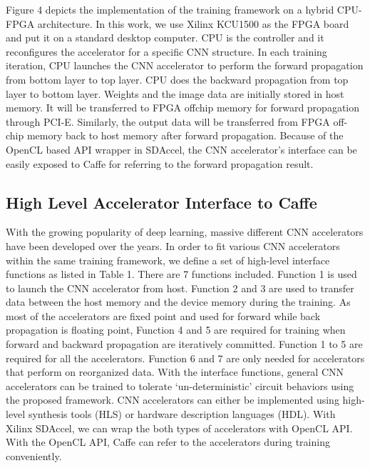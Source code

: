 Figure 4 depicts the implementation of the training framework on a hybrid 
CPU-FPGA architecture. In this work, we use Xilinx KCU1500 as the FPGA board 
and put it on a standard desktop computer. CPU is the controller and it reconfigures 
the accelerator for a specific CNN structure. In each training iteration, CPU launches 
the CNN accelerator to perform the forward propagation from bottom layer to top layer. 
CPU does the backward propagation from top layer to bottom layer. Weights and the image 
data are initially stored in host memory. It will be transferred to FPGA offchip memory 
for forward propagation through PCI-E. Similarly, the output data will be transferred 
from FPGA off-chip memory back to host memory after forward propagation. Because of the 
OpenCL based API wrapper in SDAccel, the CNN accelerator’s interface can be easily 
exposed to Caffe for referring to the forward propagation result. 



\subsection{High Level Accelerator Interface to Caffe }
  With the growing popularity of deep learning, massive different 
CNN accelerators have been developed over the years. In order to fit various CNN accelerators 
within the same training framework, we define a set of high-level interface functions as listed 
in Table 1. There are 7 functions included. Function 1 is used to launch the CNN accelerator from host. 
Function 2 and 3 are used to transfer data between the host memory and the device memory during 
the training. As most of the accelerators are fixed point and used for forward while back propagation 
is floating point, Function 4 and 5 are required for training when forward and backward 
propagation are iteratively committed. Function 1 to 5 are required for all the accelerators. 
Function 6 and 7 are only needed for accelerators that perform on reorganized data\cite{pipecnn_2,deepburing_12}. 
With the interface functions, general CNN accelerators can be trained to tolerate ‘un-deterministic’ circuit 
behaviors using the proposed framework.
  CNN accelerators can either be implemented using high-level synthesis tools (HLS) or hardware description 
languages (HDL). With Xilinx SDAccel, we can wrap the both types of accelerators with OpenCL API. 
With the OpenCL API, Caffe can refer to the accelerators during training conveniently. 

